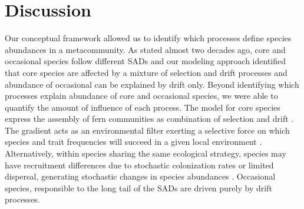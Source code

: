 \documentclass[12pt]{article}
\begin{document}

\section*{Discussion}



Our conceptual framework allowed us to identify which processes define species abundances in a metacommunity. As \cite{Magurran2003} stated almost two decades ago, core and occasional species follow different SADs and our modeling approach identified that core species are affected by a mixture of selection and drift processes and abundance of occasional can be explained by drift only. Beyond identifying which processes explain abundance of core and occasional species, we were able to quantify the amount of influence of each process. The model for core species express the assembly of fern communities as combination of selection and drift \citep{Vellend2010}. The gradient acts as an environmental filter exerting a selective force on which species and trait frequencies will succeed in a given local environment \citep{Webb2010}.  Alternatively, within species sharing the same ecological strategy, species may have recruitment differences due to stochastic colonization rates or limited dispersal, generating stochastic changes in species abundances \citep{Gravel2006, Weiher2011}. Occasional species, responsible to the long tail of the SADs are driven purely by drift processes. 
\end{document}

